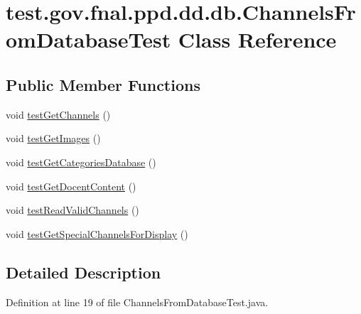 \hypertarget{classtest_1_1gov_1_1fnal_1_1ppd_1_1dd_1_1db_1_1ChannelsFromDatabaseTest}{\section{test.\-gov.\-fnal.\-ppd.\-dd.\-db.\-Channels\-From\-Database\-Test Class Reference}
\label{classtest_1_1gov_1_1fnal_1_1ppd_1_1dd_1_1db_1_1ChannelsFromDatabaseTest}
}
\subsection*{Public Member Functions}
\begin{DoxyCompactItemize}
\item 
void \hyperlink{classtest_1_1gov_1_1fnal_1_1ppd_1_1dd_1_1db_1_1ChannelsFromDatabaseTest_a349305513fe5320cff6b34992cb81110}{test\-Get\-Channels} ()
\item 
void \hyperlink{classtest_1_1gov_1_1fnal_1_1ppd_1_1dd_1_1db_1_1ChannelsFromDatabaseTest_a4c49260ff4c3870a41df703204c09beb}{test\-Get\-Images} ()
\item 
void \hyperlink{classtest_1_1gov_1_1fnal_1_1ppd_1_1dd_1_1db_1_1ChannelsFromDatabaseTest_ac9630bb04922e63db4256c119f50297e}{test\-Get\-Categories\-Database} ()
\item 
void \hyperlink{classtest_1_1gov_1_1fnal_1_1ppd_1_1dd_1_1db_1_1ChannelsFromDatabaseTest_a6b662e95b183b6a592dab615dbde0b20}{test\-Get\-Docent\-Content} ()
\item 
void \hyperlink{classtest_1_1gov_1_1fnal_1_1ppd_1_1dd_1_1db_1_1ChannelsFromDatabaseTest_a7045f80d89d5ddbd9ffe3f69951653c1}{test\-Read\-Valid\-Channels} ()
\item 
void \hyperlink{classtest_1_1gov_1_1fnal_1_1ppd_1_1dd_1_1db_1_1ChannelsFromDatabaseTest_a6b574c5e8813b8aebf1e166a53997a95}{test\-Get\-Special\-Channels\-For\-Display} ()
\end{DoxyCompactItemize}


\subsection{Detailed Description}


Definition at line 19 of file Channels\-From\-Database\-Test.\-java.



